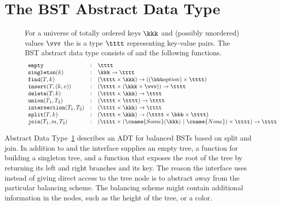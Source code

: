 \section{The BST Abstract Data Type}

\newcommand{\bstt}{\tttt}
\newcommand{\bstt}{\tttt}

\begin{figure}
\begin{datatype}[\bf BST]
\label{adt:bbst}
\normalsize For a universe of totally ordered keys $\kkk$ and
(possibly unordered) values $\vvv$ the  is a type $\bstt$
representing key-value pairs.  The BST abstract data type consists of
\bstt and  the following functions.
\[
\begin{array}{lclcl}
\texttt{empty}
& : &\bstt
\\
\texttt{singleton}(k) 
& : & \kkk \rightarrow \bstt
\\
\texttt{find}(T,k) 
& : & (\bstt \times \kkk) \rightarrow ((\bbb option) \times \bstt)
\\
\texttt{insert}(T,(k,v)) 
& : & (\bstt \times (\kkk \times \vvv)) \rightarrow  \bstt
\\
\texttt{delete}(T,k) 
& : & (\bstt \times \kkk) \rightarrow  \bstt
\\
\texttt{union}(T_1,T_2)
& : & (\bstt \times \bstt) \rightarrow  \bstt
\\
\texttt{intersection}(T_1,T_2) 
& : & (\bstt \times \kkk) \rightarrow  \bstt
\\
\texttt{split}(T,k) 
& : & (\bstt \times \kkk) \rightarrow (\bstt \times \bbb \times \bstt)
\\
\texttt{join}(T_1,m,T_2) 
& : & (\bstt \times (\cname{Some}(\kkk)~|~\cname{None}) \times \bstt) \rightarrow \bstt 
\\
\end{array}
\]
\end{datatype}
\end{figure}

Abstract Data Type~\ref{adt:bbst} describes an ADT for balanced BSTs
based on split and join.  In addition to  and
 the interface supplies an empty tree, a function for
building a singleton tree, and a function  that exposes
the root of the tree by returning its left and right branches and its
key.  The reason the interface uses  instead of giving
direct access to the tree node is to abstract away from the particular
balancing scheme.  The balancing scheme might contain additional
information in the nodes, such as the height of the tree, or a color.



